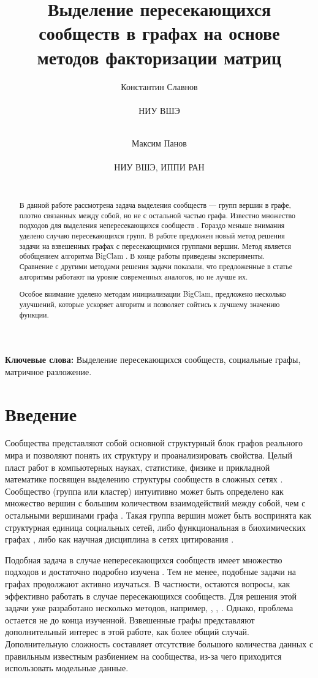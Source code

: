 \documentclass{ITaSconf}
\title{Выделение пересекающихся сообществ в графах на основе методов факторизации матриц}
\author{
	Константин Славнов \\
	\begin{affiliation}
		НИУ ВШЭ
	\end{affiliation}\\
	\email{kaslavnov@edu.hse.ru}
	\and
	Максим Панов \\
	\begin{affiliation}
		НИУ ВШЭ, ИППИ РАН
	\end{affiliation}\\
	\email{panov.maxim@gmail.com}
}
\begin{document}
	\maketitle
	
	\begin{abstract}
		В данной работе рассмотрена задача выделения сообществ --- групп вершин в графе, плотно связанных между собой, но не с остальной частью графа. Известно множество подходов для выделения непересекающихся сообществ \cite{Fortunato10}. Гораздо меньше внимания уделено случаю пересекающихся групп. В работе предложен новый метод решения задачи на взвешенных графах с пересекающимися группами вершин. Метод является обобщением алгоритма BigClam \cite{yang2013overlapping}.
		В конце работы приведены эксперименты. Сравнение с другими методами решения задачи показали, что предложенные в статье алгоритмы работают на уровне современных аналогов, но не лучше их.
		
		Особое внимание уделено методам инициализации BigClam, предложено несколько улучшений, которые ускоряет алгоритм и позволяет сойтись к лучшему значению функции.
	\end{abstract}
	
	\textbf{Ключевые слова:} Выделение пересекающихся сообществ, социальные графы, матричное разложение.
	
	\section{Введение}
	
	Сообщества представляют собой основной структурный блок графов реального мира и позволяют понять их структуру и проанализировать свойства.
	Целый пласт работ в компьютерных науках, статистике, физике и прикладной математике посвящен выделению структуры сообществ в сложных сетях \cite{Fortunato10}. Сообщество (группа или кластер) интуитивно может быть определено как множество вершин с большим количеством взаимодействий между собой, чем с остальными вершинами графа \cite{girvan2002community}. Такая группа вершин может быть воспринята как структурная единица социальных сетей, либо функциональная в биохимических графах \cite{krogan2006global}, либо как научная дисциплина в сетях цитирования \cite{backstrom2006group}. 
	
	Подобная задача в случае непересекающихся сообществ имеет множество подходов и достаточно подробно изучена \cite{Fortunato10}. Тем не менее, подобные задачи на графах продолжают активно изучаться. В частности, остаются вопросы, как эффективно работать в случае пересекающихся сообществ.
	Для решения этой задачи уже разработано несколько методов, например, \cite{airoldi2008mixed}, \cite{palla2005uncovering}, \cite{gregory2010finding}. Однако, проблема остается не до конца изученной. Взвешенные графы представляют дополнительный интерес в этой работе, как более общий случай. Дополнительную сложность составляет отсутствие большого количества данных с правильным известным разбиением на сообщества, из-за чего приходится использовать модельные данные.
	
\end{document}
